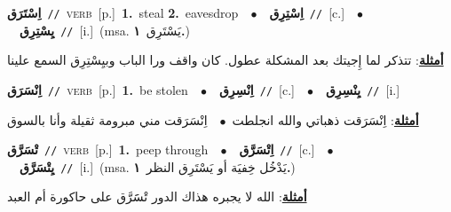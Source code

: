 \documentclass[10pt,a4paper,twoside]{article} %
\begin{document}
\begin{multicols}{2}
{\setlength\topsep{0pt}\textbf{\foreignlanguage{arabic}{اِسْتَرَق}}\ {\color{gray}\texttt{//}\color{black}}\ \textsc{verb}\ [p.]\ \textbf{1.}~steal  \textbf{2.}~eavesdrop\ \ $\bullet$\ \ \setlength\topsep{0pt}\textbf{\foreignlanguage{arabic}{اِسْتِرِق}}\ {\color{gray}\texttt{//}\color{black}}\ [c.]\ \ $\bullet$\ \ \setlength\topsep{0pt}\textbf{\foreignlanguage{arabic}{يِسْتِرِق}}\ {\color{gray}\texttt{//}\color{black}}\ [i.]\ \color{gray}(msa. \foreignlanguage{arabic}{يَسْتَرِق}~\foreignlanguage{arabic}{\textbf{١.}})\color{black}\  \begin{flushright}\color{gray}\foreignlanguage{arabic}{\textbf{\underline{\foreignlanguage{arabic}{أمثلة}}}: تتذكر لما إِجيتك بعد المشكلة عطول. كان واقف ورا الباب وبيِسْتِرِق السمع علينا}\end{flushright}\color{black}} \vspace{2mm}

{\setlength\topsep{0pt}\textbf{\foreignlanguage{arabic}{اِنْسَرَق}}\ {\color{gray}\texttt{//}\color{black}}\ \textsc{verb}\ [p.]\ \textbf{1.}~be stolen\ \ $\bullet$\ \ \setlength\topsep{0pt}\textbf{\foreignlanguage{arabic}{اِنْسِرِق}}\ {\color{gray}\texttt{//}\color{black}}\ [c.]\ \ $\bullet$\ \ \setlength\topsep{0pt}\textbf{\foreignlanguage{arabic}{يِنْسِرِق}}\ {\color{gray}\texttt{//}\color{black}}\ [i.]\  \begin{flushright}\color{gray}\foreignlanguage{arabic}{\textbf{\underline{\foreignlanguage{arabic}{أمثلة}}}: اِنْسَرَقت ذهباتي والله انجلطت\ $\bullet$\ \  اِنْسَرَقت مني مبرومة ثقيلة وأنا بالسوق}\end{flushright}\color{black}} \vspace{2mm}

{\setlength\topsep{0pt}\textbf{\foreignlanguage{arabic}{تْسَرَّق}}\ {\color{gray}\texttt{//}\color{black}}\ \textsc{verb}\ [p.]\ \textbf{1.}~peep through\ \ $\bullet$\ \ \setlength\topsep{0pt}\textbf{\foreignlanguage{arabic}{اِتْسَرَّق}}\ {\color{gray}\texttt{//}\color{black}}\ [c.]\ \ $\bullet$\ \ \setlength\topsep{0pt}\textbf{\foreignlanguage{arabic}{يِتْسَرَّق}}\ {\color{gray}\texttt{//}\color{black}}\ [i.]\ \color{gray}(msa. \foreignlanguage{arabic}{يَدْخُل خِفيَة أو يَسْتَرِق النظر}~\foreignlanguage{arabic}{\textbf{١.}})\color{black}\  \begin{flushright}\color{gray}\foreignlanguage{arabic}{\textbf{\underline{\foreignlanguage{arabic}{أمثلة}}}: الله لا يجبره هذاك الدور تْسََرَّق على حاكورة أم العبد}\end{flushright}\color{black}} \vspace{2mm}


\end{multicols}
\end{document}

